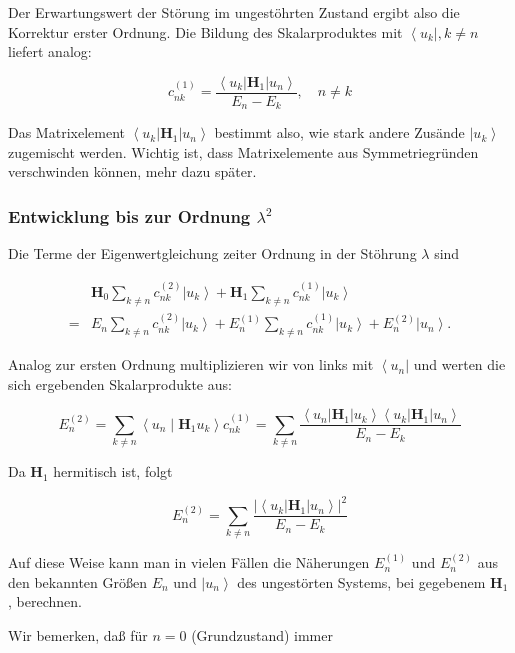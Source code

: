 \documentclass[10pt, letterpaper]{article}
\begin{document}
Der Erwartungswert der Störung im ungestöhrten Zustand ergibt also die Korrektur erster Ordnung. Die Bildung des Skalarproduktes mit $\left\langle u_{k}\right|, k \neq n$ liefert analog:

$$
c_{n k}^{(1)}=\frac{\left\langle u_{k}\right| \mathbf{H}_{1}\left|u_{n}\right\rangle}{E_{n}-E_{k}}, \quad n \neq k
$$

Das Matrixelement $\left\langle u_{k}\right| \mathbf{H}_{1}\left|u_{n}\right\rangle$ bestimmt also, wie stark andere Zusände $\left|u_{k}\right\rangle$ zugemischt werden. Wichtig ist, dass Matrixelemente aus Symmetriegründen verschwinden können, mehr dazu später.

\subsubsection*{Entwicklung bis zur Ordnung $\lambda^{2}$}
Die Terme der Eigenwertgleichung zeiter Ordnung in der Stöhrung $\lambda$ sind

$$
\begin{aligned}
& \mathbf{H}_{0} \sum_{k \neq n} c_{n k}^{(2)}\left|u_{k}\right\rangle+\mathbf{H}_{1} \sum_{k \neq n} c_{n k}^{(1)}\left|u_{k}\right\rangle \\
= & E_{n} \sum_{k \neq n} c_{n k}^{(2)}\left|u_{k}\right\rangle+E_{n}^{(1)} \sum_{k \neq n} c_{n k}^{(1)}\left|u_{k}\right\rangle+E_{n}^{(2)}\left|u_{n}\right\rangle .
\end{aligned}
$$

Analog zur ersten Ordnung multiplizieren wir von links mit $\left\langle u_{n}\right|$ und werten die sich ergebenden Skalarprodukte aus:

$$
E_{n}^{(2)}=\sum_{k \neq n}\left\langle u_{n} \mid \mathbf{H}_{1} u_{k}\right\rangle c_{n k}^{(1)}=\sum_{k \neq n} \frac{\left\langle u_{n}\right| \mathbf{H}_{1}\left|u_{k}\right\rangle\left\langle u_{k}\right| \mathbf{H}_{1}\left|u_{n}\right\rangle}{E_{n}-E_{k}}
$$

Da $\mathbf{H}_{1}$ hermitisch ist, folgt

$$
E_{n}^{(2)}=\sum_{k \neq n} \frac{\left.\left|\left\langle u_{k}\right| \mathbf{H}_{1}\right| u_{n}\right\rangle\left.\right|^{2}}{E_{n}-E_{k}}
$$

Auf diese Weise kann man in vielen Fällen die Näherungen $E_{n}^{(1)}$ und $E_{n}^{(2)}$ aus den bekannten Größen $E_{n}$ und $\left|u_{n}\right\rangle$ des ungestörten Systems, bei gegebenem $\mathbf{H}_{1}$, berechnen.

Wir bemerken, daß für $n=0$ (Grundzustand) immer
\end{document}
